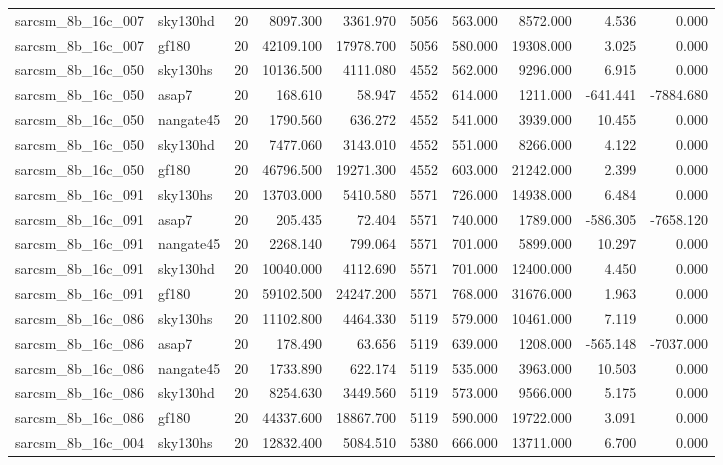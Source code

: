 \documentclass{article}
\begin{document}
\begin{longtable}{llrrrrrrrr}
sarcsm\_8b\_16c\_007 & sky130hd & 20 & 8097.300 & 3361.970 & 5056 & 563.000 & 8572.000 & 4.536 & 0.000 \\
sarcsm\_8b\_16c\_007 & gf180 & 20 & 42109.100 & 17978.700 & 5056 & 580.000 & 19308.000 & 3.025 & 0.000 \\
sarcsm\_8b\_16c\_050 & sky130hs & 20 & 10136.500 & 4111.080 & 4552 & 562.000 & 9296.000 & 6.915 & 0.000 \\
sarcsm\_8b\_16c\_050 & asap7 & 20 & 168.610 & 58.947 & 4552 & 614.000 & 1211.000 & -641.441 & -7884.680 \\
sarcsm\_8b\_16c\_050 & nangate45 & 20 & 1790.560 & 636.272 & 4552 & 541.000 & 3939.000 & 10.455 & 0.000 \\
sarcsm\_8b\_16c\_050 & sky130hd & 20 & 7477.060 & 3143.010 & 4552 & 551.000 & 8266.000 & 4.122 & 0.000 \\
sarcsm\_8b\_16c\_050 & gf180 & 20 & 46796.500 & 19271.300 & 4552 & 603.000 & 21242.000 & 2.399 & 0.000 \\
sarcsm\_8b\_16c\_091 & sky130hs & 20 & 13703.000 & 5410.580 & 5571 & 726.000 & 14938.000 & 6.484 & 0.000 \\
sarcsm\_8b\_16c\_091 & asap7 & 20 & 205.435 & 72.404 & 5571 & 740.000 & 1789.000 & -586.305 & -7658.120 \\
sarcsm\_8b\_16c\_091 & nangate45 & 20 & 2268.140 & 799.064 & 5571 & 701.000 & 5899.000 & 10.297 & 0.000 \\
sarcsm\_8b\_16c\_091 & sky130hd & 20 & 10040.000 & 4112.690 & 5571 & 701.000 & 12400.000 & 4.450 & 0.000 \\
sarcsm\_8b\_16c\_091 & gf180 & 20 & 59102.500 & 24247.200 & 5571 & 768.000 & 31676.000 & 1.963 & 0.000 \\
sarcsm\_8b\_16c\_086 & sky130hs & 20 & 11102.800 & 4464.330 & 5119 & 579.000 & 10461.000 & 7.119 & 0.000 \\
sarcsm\_8b\_16c\_086 & asap7 & 20 & 178.490 & 63.656 & 5119 & 639.000 & 1208.000 & -565.148 & -7037.000 \\
sarcsm\_8b\_16c\_086 & nangate45 & 20 & 1733.890 & 622.174 & 5119 & 535.000 & 3963.000 & 10.503 & 0.000 \\
sarcsm\_8b\_16c\_086 & sky130hd & 20 & 8254.630 & 3449.560 & 5119 & 573.000 & 9566.000 & 5.175 & 0.000 \\
sarcsm\_8b\_16c\_086 & gf180 & 20 & 44337.600 & 18867.700 & 5119 & 590.000 & 19722.000 & 3.091 & 0.000 \\
sarcsm\_8b\_16c\_004 & sky130hs & 20 & 12832.400 & 5084.510 & 5380 & 666.000 & 13711.000 & 6.700 & 0.000 \\

\end{longtable}
\end{document}
